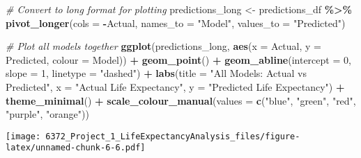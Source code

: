 \documentclass[
]{article}
\newenvironment{Shaded}{\begin{snugshade}}{\end{snugshade}}
\newcommand{\AttributeTok}[1]{\textcolor[rgb]{0.13,0.29,0.53}{#1}}
\newcommand{\CommentTok}[1]{\textcolor[rgb]{0.56,0.35,0.01}{\textit{#1}}}
\newcommand{\DecValTok}[1]{\textcolor[rgb]{0.00,0.00,0.81}{#1}}
\newcommand{\FunctionTok}[1]{\textcolor[rgb]{0.13,0.29,0.53}{\textbf{#1}}}
\newcommand{\NormalTok}[1]{#1}
\newcommand{\OtherTok}[1]{\textcolor[rgb]{0.56,0.35,0.01}{#1}}
\newcommand{\SpecialCharTok}[1]{\textcolor[rgb]{0.81,0.36,0.00}{\textbf{#1}}}
\newcommand{\StringTok}[1]{\textcolor[rgb]{0.31,0.60,0.02}{#1}}
\begin{document}
\begin{Shaded}
\begin{Highlighting}[]
\CommentTok{\# Convert to long format for plotting}
\NormalTok{predictions\_long }\OtherTok{\textless{}{-}}\NormalTok{ predictions\_df }\SpecialCharTok{\%\textgreater{}\%}
  \FunctionTok{pivot\_longer}\NormalTok{(}\AttributeTok{cols =} \SpecialCharTok{{-}}\NormalTok{Actual, }\AttributeTok{names\_to =} \StringTok{"Model"}\NormalTok{, }\AttributeTok{values\_to =} \StringTok{"Predicted"}\NormalTok{)}

\CommentTok{\# Plot all models together}
\FunctionTok{ggplot}\NormalTok{(predictions\_long, }\FunctionTok{aes}\NormalTok{(}\AttributeTok{x =}\NormalTok{ Actual, }\AttributeTok{y =}\NormalTok{ Predicted, }\AttributeTok{colour =}\NormalTok{ Model)) }\SpecialCharTok{+}
  \FunctionTok{geom\_point}\NormalTok{() }\SpecialCharTok{+}
  \FunctionTok{geom\_abline}\NormalTok{(}\AttributeTok{intercept =} \DecValTok{0}\NormalTok{, }\AttributeTok{slope =} \DecValTok{1}\NormalTok{, }\AttributeTok{linetype =} \StringTok{"dashed"}\NormalTok{) }\SpecialCharTok{+}
  \FunctionTok{labs}\NormalTok{(}\AttributeTok{title =} \StringTok{"All Models: Actual vs Predicted"}\NormalTok{, }\AttributeTok{x =} \StringTok{"Actual Life Expectancy"}\NormalTok{, }\AttributeTok{y =} \StringTok{"Predicted Life Expectancy"}\NormalTok{) }\SpecialCharTok{+}
  \FunctionTok{theme\_minimal}\NormalTok{() }\SpecialCharTok{+}
  \FunctionTok{scale\_colour\_manual}\NormalTok{(}\AttributeTok{values =} \FunctionTok{c}\NormalTok{(}\StringTok{"blue"}\NormalTok{, }\StringTok{"green"}\NormalTok{, }\StringTok{"red"}\NormalTok{, }\StringTok{"purple"}\NormalTok{, }\StringTok{"orange"}\NormalTok{))}
\end{Highlighting}
\end{Shaded}

\texttt{[image: 6372\_Project\_1\_LifeExpectancyAnalysis\_files/figure-latex/unnamed-chunk-6-6.pdf]}
\end{document}
